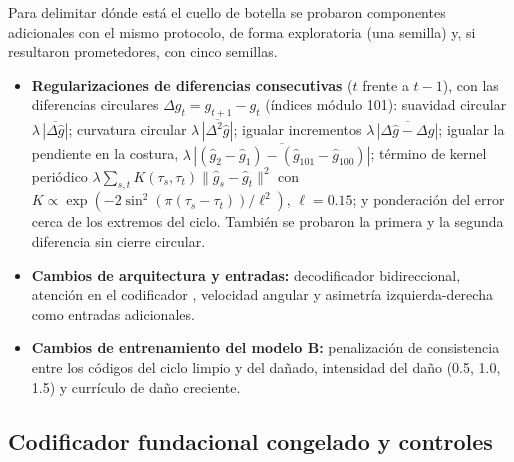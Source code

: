 \documentclass[11pt,a4paper]{article}
\begin{document}
Para delimitar dónde está el cuello de botella se probaron componentes adicionales con el mismo protocolo, de forma exploratoria (una semilla) y, si resultaron prometedores, con cinco semillas.
\begin{itemize}
\item \textbf{Regularizaciones de diferencias consecutivas} ($t$ frente a $t-1$), con las diferencias circulares $\Delta g_t=g_{t+1}-g_t$ (índices módulo 101): suavidad circular $\lambda\,\overline{|\Delta\hat g|}$; curvatura circular $\lambda\,\overline{|\Delta^2\hat g|}$; igualar incrementos $\lambda\,\overline{|\Delta\hat g-\Delta g|}$; igualar la pendiente en la costura, $\lambda\,\overline{|(\hat g_2-\hat g_1)-(\hat g_{101}-\hat g_{100})|}$; término de kernel periódico $\lambda\sum_{s,t}K(\tau_s,\tau_t)\|\hat g_s-\hat g_t\|^2$ con $K\propto\exp(-2\sin^2(\pi(\tau_s-\tau_t))/\ell^2)$, $\ell=0.15$; y ponderación del error cerca de los extremos del ciclo. También se probaron la primera y la segunda diferencia sin cierre circular.
\item \textbf{Cambios de arquitectura y entradas:} decodificador bidireccional, atención en el codificador \cite{bahdanau2015}, velocidad angular y asimetría izquierda-derecha como entradas adicionales.
\item \textbf{Cambios de entrenamiento del modelo B:} penalización de consistencia entre los códigos del ciclo limpio y del dañado, intensidad del daño (0.5, 1.0, 1.5) y currículo de daño creciente.
\end{itemize}

\subsection{Codificador fundacional congelado y controles}
\label{sec:fundacional}
\end{document}
